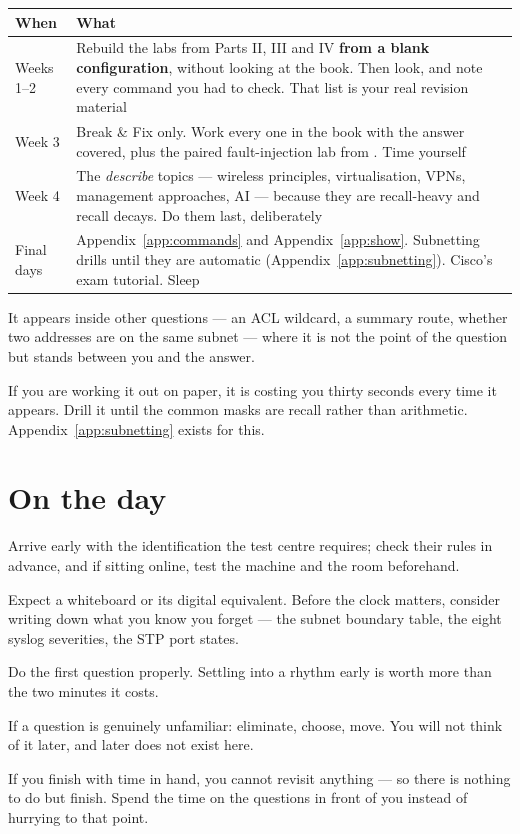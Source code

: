 \begin{longtable}{@{}L{2.6cm}L{12.4cm}@{}}
\toprule
{}
\textbf{When} & \textbf{What} \\
\midrule
\endhead
Weeks 1--2 &
Rebuild the labs from Parts II, III and IV \textbf{from a blank configuration},
without looking at the book. Then look, and note every command you had to check.
That list is your real revision material \\
Week 3 &
Break \& Fix only. Work every one in the book with the answer covered, plus the
paired fault-injection lab from . Time yourself \\
Week 4 &
The \emph{describe} topics --- wireless principles, virtualisation, VPNs,
management approaches, AI --- because they are recall-heavy and recall decays.
Do them last, deliberately \\
Final days &
Appendix~\ref{app:commands} and Appendix~\ref{app:show}. Subnetting drills until
they are automatic (Appendix~\ref{app:subnetting}). Cisco's exam tutorial. Sleep \\
\bottomrule
\end{longtable}

\begin{conceptbox}
It appears inside other questions --- an ACL wildcard, a summary route, whether
two addresses are on the same subnet --- where it is not the point of the
question but stands between you and the answer.

If you are working it out on paper, it is costing you thirty seconds every time
it appears. Drill it until the common masks are recall rather than arithmetic.
Appendix~\ref{app:subnetting} exists for this.
\end{conceptbox}

\section{On the day}

\begin{tight}
  \item Arrive early with the identification the test centre requires; check
        their rules in advance, and if sitting online, test the machine and the
        room beforehand.
  \item Expect a whiteboard or its digital equivalent. Before the clock matters,
        consider writing down what you know you forget --- the subnet boundary
        table, the eight syslog severities, the STP port states.
  \item Do the first question properly. Settling into a rhythm early is worth
        more than the two minutes it costs.
  \item If a question is genuinely unfamiliar: eliminate, choose, move. You will
        not think of it later, and later does not exist here.
  \item If you finish with time in hand, you cannot revisit anything --- so
        there is nothing to do but finish. Spend the time on the questions in
        front of you instead of hurrying to that point.
\end{tight}

